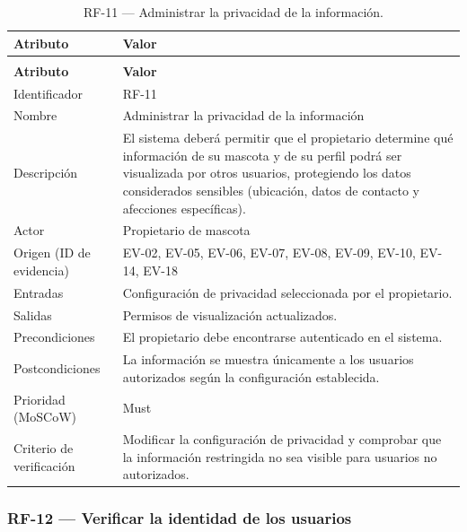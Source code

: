 \documentclass[journal,onecolumn]{IEEEtran}
\makeatletter
\newenvironment{atributos}[2]{%
	\small
	\begin{longtable}{@{}>{\raggedright\arraybackslash}p{4.2cm} >{\raggedright\arraybackslash}p{11.2cm}@{}}
		\caption{#2}\label{tab:#1}\\
		\toprule
		\textbf{Atributo} & \textbf{Valor} \\
		\midrule
		\endfirsthead
		\multicolumn{2}{@{}l}{\small\itshape (continuación)}\\
		\toprule
		\textbf{Atributo} & \textbf{Valor} \\
		\midrule
		\endhead
		\bottomrule
		\endlastfoot
	}{%
	\end{longtable}
	\normalsize
}
\makeatother
\begin{document}
	\begin{atributos}{RF-11}{RF-11 --- Administrar la privacidad de la información.}
		Identificador & RF-11 \\
		Nombre & Administrar la privacidad de la información \\
		Descripción & El sistema deberá permitir que el propietario determine qué información de su mascota y de su perfil podrá ser visualizada por otros usuarios, protegiendo los datos considerados sensibles (ubicación, datos de contacto y afecciones específicas). \\
		Actor & Propietario de mascota \\
		Origen (ID de evidencia) & EV-02, EV-05, EV-06, EV-07, EV-08, EV-09, EV-10, EV-14, EV-18 \\
		Entradas & Configuración de privacidad seleccionada por el propietario. \\
		Salidas & Permisos de visualización actualizados. \\
		Precondiciones & El propietario debe encontrarse autenticado en el sistema. \\
		Postcondiciones & La información se muestra únicamente a los usuarios autorizados según la configuración establecida. \\
		Prioridad (MoSCoW) & Must \\
		Criterio de verificación & Modificar la configuración de privacidad y comprobar que la información restringida no sea visible para usuarios no autorizados. \\
	\end{atributos}
	
	\subsubsection{RF-12 --- Verificar la identidad de los usuarios}
	
\end{document}
